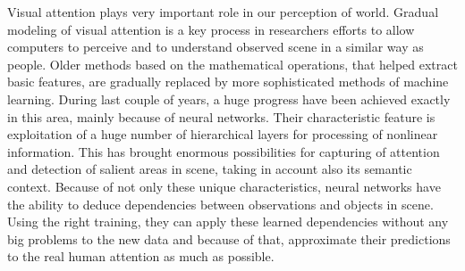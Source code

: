 Visual attention plays very important role in our perception of world. Gradual modeling of visual attention is a key process in researchers efforts to allow computers to perceive and to understand observed scene in a similar way as people. Older methods based on the mathematical operations, that helped extract basic features, are gradually replaced by more sophisticated methods of machine learning. During last couple of years, a huge progress have been achieved exactly in this area, mainly because of neural networks. Their characteristic feature is exploitation of a huge number of hierarchical layers for processing of nonlinear information. This has brought enormous possibilities for capturing of attention and detection of salient areas in scene, taking in account also its semantic context. Because of not only these unique characteristics, neural networks have the ability to deduce dependencies between observations and objects in scene. Using the right training, they can apply these learned dependencies without any big problems to the new data and because of that, approximate their predictions  to the real human attention as much as possible.
